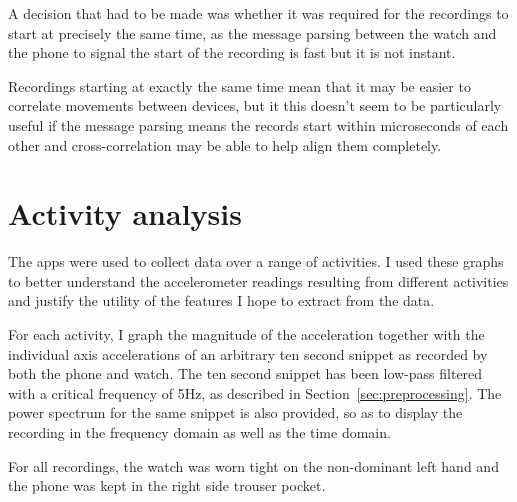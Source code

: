       A decision that had to be made was whether it was required for the recordings to start at precisely the same time, as the message parsing between the watch and the phone to signal the start of the recording is fast but it is not instant. 
      
      Recordings starting at exactly the same time mean that it may be easier to correlate movements between devices, but it this doesn't seem to be particularly useful if the message parsing means the records start within microseconds of each other and cross-correlation may be able to help align them completely.  
      
  \section{Activity analysis}
    \label{sec:activity-details}
    The apps were used to collect data over a range of activities. I used these graphs to better understand the accelerometer readings resulting from different activities and justify the utility of the features I hope to extract from the data.
    
    For each activity, I graph the magnitude of the acceleration together with the individual axis accelerations of an arbitrary ten second snippet as recorded by both the phone and watch. The ten second snippet has been low-pass filtered with a critical frequency of 5Hz, as described in Section~\ref{sec:preprocessing}. The power spectrum for the same snippet is also provided, so as to display the recording in the frequency domain as well as the time domain.
    
    For all recordings, the watch was worn tight on the non-dominant left hand and the phone was kept in the right side trouser pocket.
    
